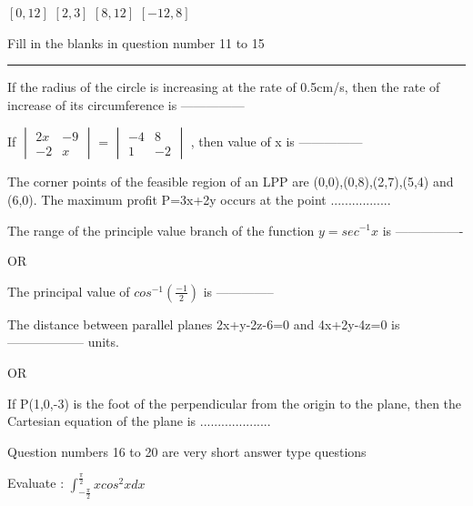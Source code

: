 \documentclass[legalpaper, 12pt, addpoints]{exam}
\begin{document}
\begin{questions}
\begin{oneparchoices}
    \choice $\left[0,12\right]$
    \CorrectChoice $\left[2,3\right]$
    \choice $\left[8,12\right]$
    \choice $\left[-12,8\right]$
\end{oneparchoices}

\vspace{0.3in}
\parbox{6in}{Fill in the blanks in question number 11 to 15}
\vspace{0.2in}
\hrule
\vspace{0.1in}

\question If the radius of the circle is increasing at the rate of 0.5cm/s, then the rate of increase of its circumference is ---------------
    
\question If $\begin{vmatrix} 2x & -9 \\ -2 & x \end{vmatrix}$ = $\begin{vmatrix} -4 & 8 \\ 1 & -2 \end{vmatrix}$ , then value of x is ---------------
        
\question The corner points of the feasible region of an LPP are (0,0),(0,8),(2,7),(5,4) and (6,0). The maximum profit P=3x+2y occurs at the point .................
       
\question The range of the principle value branch of the function $ y= sec^{-1}x $ is ----------------
        
    \begin{center}
        OR
    \end{center}
The principal value of $cos^{-1} \left(\frac{-1}{2}\right)$ is --------------

\question The distance between parallel planes 2x+y-2z-6=0 and 4x+2y-4z=0 is ------------------ units.
\begin{center}
        OR
    \end{center}
    If P(1,0,-3) is the foot of the perpendicular from the origin to the plane, then the Cartesian equation of the plane is .................... 
    
\vspace{0.2in}
    Question numbers 16 to 20 are very short answer type questions  \\
\vspace{0.1in}


\question Evaluate : $\int_{-\frac{\pi}{2}}^{\frac{\pi}{2}} x cos^2 x dx$
   

\end{questions}
\end{document}
